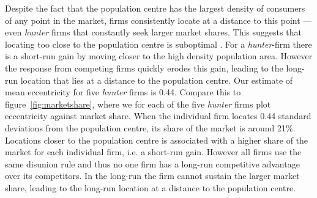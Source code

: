 \documentclass[preprint, 12pt]{elsarticle}
\begin{document}

Despite the fact that the population centre has the largest density of consumers of any point in the market, firms consistently locate at a distance to this point — even \emph{hunter} firms that constantly seek larger market shares. This suggests that locating too close to the population centre is suboptimal \citep[chapter~5]{Laver_Sergenti_2011}. For a \emph{hunter}-firm there is a short-run gain by moving closer to the high density population area. However the response from competing firms quickly erodes this gain, leading to the long-run location that lies at a distance to the population centre. Our estimate of mean eccentricity for five \emph{hunter} firms is 0.44. Compare this to figure~\ref{fig:marketshare}, where we for each of the five \emph{hunter} firms plot eccentricity against market share. When the individual firm locates 0.44 standard deviations from the population centre, its share of the market is around 21\%. Locations closer to the population centre is associated with a higher share of the market for each individual firm, i.e. a short-run gain. However all firms use the same disunion rule and thus no one firm has a long-run competitive advantage over its competitors. In the long-run the firm cannot sustain the larger market share, leading to the long-run location at a distance to the population centre.
\end{document}
